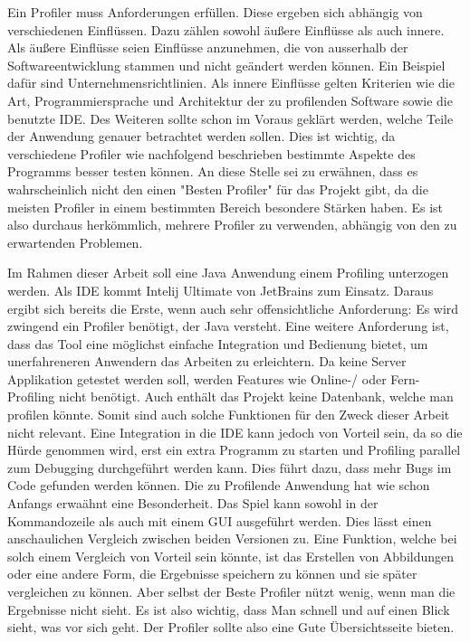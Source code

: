 \documentclass[a4paper,12pt]{scrreprt}
\begin{document}
Ein Profiler muss Anforderungen erfüllen. Diese ergeben sich abhängig von verschiedenen Einflüssen. Dazu zählen sowohl äußere Einflüsse als auch innere. Als äußere Einflüsse seien Einflüsse anzunehmen, die von ausserhalb der Softwareentwicklung stammen und nicht geändert werden können. Ein Beispiel dafür sind Unternehmensrichtlinien. Als innere Einflüsse gelten Kriterien wie die Art, Programmiersprache und Architektur der zu profilenden Software sowie die benutzte IDE. Des Weiteren sollte schon im Voraus geklärt werden, welche Teile der Anwendung genauer betrachtet werden sollen. Dies ist wichtig, da verschiedene Profiler wie nachfolgend beschrieben bestimmte Aspekte des Programms besser testen können. An diese Stelle sei zu erwähnen, dass es wahrscheinlich nicht den einen "Besten Profiler" für das Projekt gibt, da die meisten Profiler in einem bestimmten Bereich besondere Stärken haben. Es ist also durchaus herkömmlich, mehrere Profiler zu verwenden, abhängig von den zu erwartenden Problemen. 


Im Rahmen dieser Arbeit soll eine Java Anwendung einem Profiling unterzogen werden. Als IDE kommt Intelij Ultimate von JetBrains zum Einsatz. Daraus ergibt sich bereits die Erste, wenn auch sehr offensichtliche Anforderung: Es wird zwingend ein Profiler benötigt, der Java versteht. Eine weitere Anforderung ist, dass das Tool eine möglichst einfache Integration und Bedienung bietet, um unerfahreneren Anwendern das Arbeiten zu erleichtern. Da keine Server Applikation getestet werden soll, werden Features wie Online-/ oder Fern-Profiling nicht benötigt. Auch enthält das Projekt keine Datenbank, welche man profilen könnte. Somit sind auch solche Funktionen für den Zweck dieser Arbeit nicht relevant. Eine Integration in die IDE kann jedoch von Vorteil sein, da so die Hürde genommen wird, erst ein extra Programm zu starten und Profiling parallel zum Debugging durchgeführt werden kann. Dies führt dazu, dass mehr Bugs im Code gefunden werden können. Die zu Profilende Anwendung hat wie schon Anfangs erwaähnt eine Besonderheit. Das Spiel kann sowohl in der Kommandozeile als auch mit einem GUI ausgeführt werden.
Dies lässt einen anschaulichen Vergleich zwischen beiden Versionen zu. Eine Funktion, welche bei solch einem Vergleich von Vorteil sein könnte, ist das Erstellen von Abbildungen oder eine andere Form, die Ergebnisse speichern zu können und sie später vergleichen zu können.
Aber selbst der Beste Profiler nützt wenig, wenn man die Ergebnisse nicht sieht. Es ist also wichtig, dass Man schnell und auf einen Blick sieht, was vor sich geht. Der Profiler sollte also eine Gute Übersichtsseite bieten. 
\end{document}
